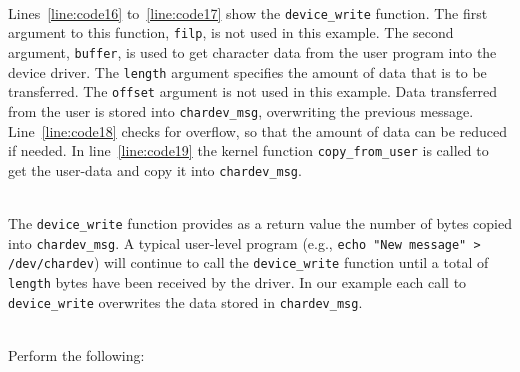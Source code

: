 \documentclass[epsfig,10pt,fullpage]{article}
\begin{document}
~\\
\noindent
Lines~\ref{line:code16} to~\ref{line:code17} show the \texttt{device\_write} function. The
first argument to this function, \texttt{filp}, is not used in this example. The second argument,
\texttt{buffer}, is used to get character data from the user program into the device driver.
The \texttt{length} argument specifies the amount of data that is to be transferred.
The \texttt{offset} argument is not used in this example.
Data transferred from the user is stored into \texttt{chardev\_msg}, overwriting the
previous message.
Line~\ref{line:code18} checks for overflow, so that the amount of data can be reduced if needed. 
In line~\ref{line:code19} the kernel function \texttt{copy\_from\_user} is called to get
the user-data and copy it into \texttt{chardev\_msg}. 

~\\
The \texttt{device\_write} function provides as a return value the number of bytes copied
into \texttt{chardev\_msg}. A typical user-level program (e.g., \texttt{echo "New message" 
> /dev/chardev}) will continue to call the \texttt{device\_write} function until a total 
of \texttt{length} bytes have been received by the driver. In our example each call to 
\texttt{device\_write} overwrites the data stored in \texttt{chardev\_msg}.

~\\
\noindent
Perform the following:
\end{document}
